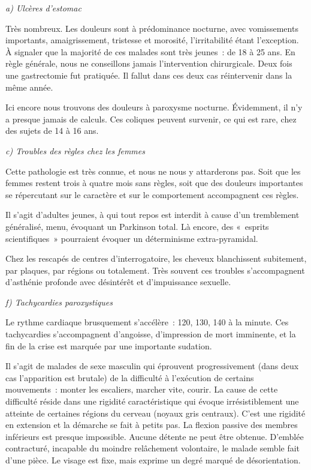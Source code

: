 \documentclass[french,twoside]{book} %
\begin{document}
\bigbreak
\noindent \emph{a) Ulcères d’estomac}\par
Très nombreux. Les douleurs sont à prédominance nocturne, avec vomissements importants, amaigrissement, tristesse et morosité, l’irritabilité étant l’exception. À signaler que la majorité de ces malades sont très jeunes : de 18 à 25 ans. En règle générale, nous ne conseillons jamais l’intervention chirurgicale. Deux fois une gastrectomie fut pratiquée. Il fallut dans ces deux cas réintervenir dans la même année.\par
\bigbreak
{}\par
Ici encore nous trouvons des douleurs à paroxysme nocturne. Évidemment, il n’y a presque jamais de calculs. Ces coliques peuvent survenir, ce qui est rare, chez des sujets de 14 à 16 ans.\par
\bigbreak
\noindent \emph{c) Troubles des règles chez les femmes}\par
Cette pathologie est très connue, et nous ne nous y attarderons pas. Soit que les femmes restent trois à quatre mois sans règles, soit que des douleurs importantes se répercutant sur le caractère et sur le comportement accompagnent ces règles.\par
\bigbreak
{}\par
Il s’agit d’adultes jeunes, à qui tout repos est interdit à cause d’un tremblement généralisé, menu, évoquant un Parkinson total. Là encore, des « esprits scientifiques » pourraient évoquer un déterminisme extra-pyramidal.\par
\bigbreak
{}\par
Chez les rescapés de centres d’interrogatoire, les cheveux blanchissent subitement, par plaques, par régions ou totalement. Très souvent ces troubles s’accompagnent d’asthénie profonde avec désintérêt et d’impuissance sexuelle.\par
\bigbreak
\noindent \emph{f) Tachycardies paroxystiques}\par
Le rythme cardiaque brusquement s’accélère : 120, 130, 140 à la minute. Ces tachycardies s’accompagnent d’angoisse, d’impression   de mort imminente, et la fin de la crise est marquée par une importante sudation.\par
\bigbreak
{}\par
Il s’agit de malades de sexe masculin qui éprouvent progressivement (dans deux cas l’apparition est brutale) de la difficulté à l’exécution de certains mouvements : monter les escaliers, marcher vite, courir. La cause de cette difficulté réside dans une rigidité caractéristique qui évoque irrésistiblement une atteinte de certaines régions du cerveau (noyaux gris centraux). C’est une rigidité en extension et la démarche se fait à petits pas. La flexion passive des membres inférieurs est presque impossible. Aucune détente ne peut être obtenue. D’emblée contracturé, incapable du moindre relâchement volontaire, le malade semble fait d’une pièce. Le visage est fixe, mais exprime un degré marqué de désorientation.\par
\end{document}
